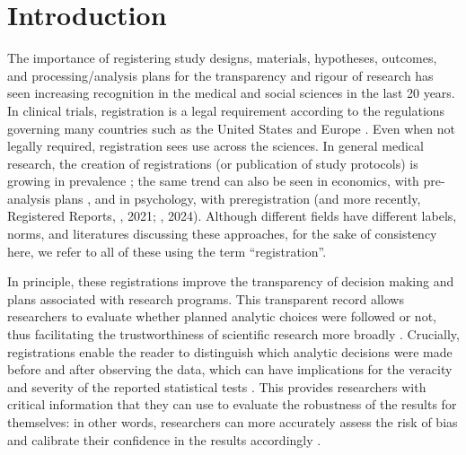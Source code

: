 \documentclass{article}
\begin{document}
\newpage
\section{Introduction}
The importance of registering study designs, materials, hypotheses, outcomes, and processing/analysis plans for the transparency and rigour of research has seen increasing recognition in the medical and social sciences in the last 20 years. In clinical trials, registration is a legal requirement according to the regulations governing many countries such as the United States \citep{noauthor_nih_nodate} and Europe \citep{noauthor_regulation_2014}. Even when not legally required, registration sees use across the sciences. In general medical research, the creation of registrations (or publication of study protocols) is growing in prevalence \citep{tan_prevalence_2019}; the same trend can also be seen in economics, with pre-analysis plans \citep{ofosu_pre-analysis_2023}, and in psychology, with preregistration (and more recently, Registered Reports, \citeauthor{chambers_past_2021}, 2021; \citeauthor{hardwicke_prevalence_2024}, 2024). Although different fields have different labels, norms, and literatures discussing these approaches, for the sake of consistency here, we refer to all of these using the term ``registration''.

In principle, these registrations improve the transparency of decision making and plans associated with research programs. This transparent record allows researchers to evaluate whether planned analytic choices were followed or not, thus facilitating the trustworthiness of scientific research more broadly \citep{hardwicke_reducing_2023}. Crucially, registrations enable the reader to distinguish which analytic decisions were made before and after observing the data, which can have implications for the veracity and severity of the reported statistical tests \citep{simmons_false-positive_2011}. This provides researchers with critical information that they can use to evaluate the robustness of the results for themselves: in other words, researchers can more accurately assess the risk of bias and calibrate their confidence in the results accordingly \citep{hardwicke_reducing_2023}.
\end{document}
